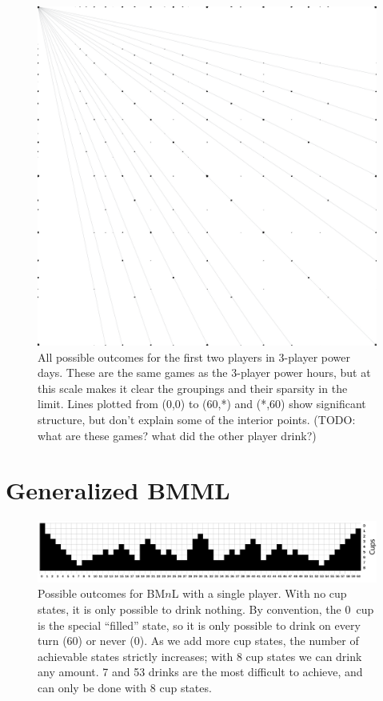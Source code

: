 \documentclass[twocolumn]{article}
\begin{document}
\begin{figure}
\begin{center}
\includegraphics[width=0.90 \linewidth]{powerday3.pdf}
\end{center}\vspace{-0.1in}
\caption{All possible outcomes for the first two players in 3-player
  power days. These are the same games as the 3-player power hours,
  but at this scale makes it clear the groupings and their sparsity
  in the limit. Lines plotted from (0,0) to (60,*) and (*,60) show
  significant structure, but don't explain some of the interior points.
  (TODO: what are these games? what did the other player drink?)
}
\label{fig:powerday3}
\end{figure}


\section{Generalized BMML}

\begin{figure}
\begin{center}
\includegraphics[width=0.90 \linewidth]{soloncups.pdf}
\end{center}\vspace{-0.1in}
\caption{Possible outcomes for BM$n$L with a single player. With no
  cup states, it is only possible to drink nothing. By convention, the
  0\th\ cup is the special ``filled'' state, so it is only possible to
  drink on every turn (60) or never (0). As we add more cup states,
  the number of achievable states strictly increases; with 8 cup states
  we can drink any amount. 7 and 53 drinks are the most difficult to
  achieve, and can only be done with 8 cup states.
}
\label{fig:soloncups}
\end{figure}
\end{document}
